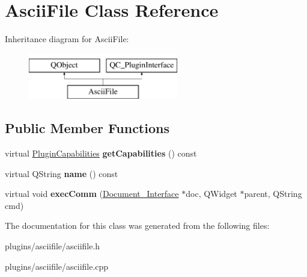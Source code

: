 \hypertarget{classAsciiFile}{\section{Ascii\-File Class Reference}
\label{classAsciiFile}
}
Inheritance diagram for Ascii\-File\-:\begin{figure}[H]
\begin{center}
\leavevmode
\includegraphics[height=2.000000cm]{classAsciiFile}
\end{center}
\end{figure}
\subsection*{Public Member Functions}
\begin{DoxyCompactItemize}
\item 
\hypertarget{classAsciiFile_a931df375d0e8f209c2df12767d321169}{virtual \hyperlink{classPluginCapabilities}{Plugin\-Capabilities} {\bfseries get\-Capabilities} () const }\label{classAsciiFile_a931df375d0e8f209c2df12767d321169}

\item 
\hypertarget{classAsciiFile_a2620e3cbb9d092921c4c2cbbec5acda6}{virtual Q\-String {\bfseries name} () const }\label{classAsciiFile_a2620e3cbb9d092921c4c2cbbec5acda6}

\item 
\hypertarget{classAsciiFile_a818bd371e67f3734cea0b20982e501c3}{virtual void {\bfseries exec\-Comm} (\hyperlink{classDocument__Interface}{Document\-\_\-\-Interface} $\ast$doc, Q\-Widget $\ast$parent, Q\-String cmd)}\label{classAsciiFile_a818bd371e67f3734cea0b20982e501c3}

\end{DoxyCompactItemize}


The documentation for this class was generated from the following files\-:\begin{DoxyCompactItemize}
\item 
plugins/asciifile/asciifile.\-h\item 
plugins/asciifile/asciifile.\-cpp\end{DoxyCompactItemize}
